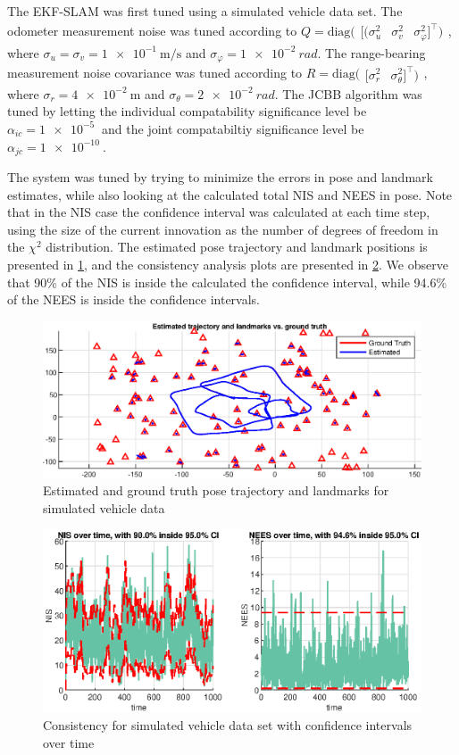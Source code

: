 The EKF-SLAM was first tuned using a simulated vehicle data set. The odometer measurement noise was tuned according to $Q = \text{diag}(\begin{array}{ccc}[(\sigma_u^2 & \sigma_v^2 & \sigma_\varphi^2 ]^{\top})\end{array}$, where $\sigma_u = \sigma_v = \SI{1e-1}{\meter\per\second}$ and $\sigma_\varphi = \SI{1e-2}{rad}$. The range-bearing measurement noise covariance was tuned according to $R = \text{diag}(\begin{array}{cc}[\sigma_r^2 & \sigma_\theta^2 ]^{\top})\end{array}$, where $\sigma_r = \SI{4e-2}{\meter}$ and $\sigma_\theta = \SI{2e-2}{rad}$. The JCBB algorithm was tuned by letting the individual compatability significance level be $\alpha_{ic} = \SI{1e-5}{}$ and the joint compatabiltiy significance level be $\alpha_{jc} = \SI{1e-10}{}$.

The system was tuned by trying to minimize the errors in pose and landmark estimates, while also looking at the calculated total NIS and NEES in pose. Note that in the NIS case the confidence interval was calculated at each time step, using the size of the current innovation as the number of degrees of freedom in the $\chi^2$ distribution. The estimated pose trajectory and landmark positions is presented in \cref{fig:ga_3_sim_trajectory}, and the consistency analysis plots are presented in \cref{fig:ga_3_sim_NIS}. We observe that 90\% of the NIS is inside the calculated the confidence interval, while 94.6\% of the NEES is inside the confidence intervals.

\begin{figure}[!htb]
    \centering
    \includegraphics[width=0.7\linewidth]{figures/ga_3/sim_trajectory.eps}
    \caption{Estimated and ground truth pose trajectory and landmarks for simulated vehicle data}
    \label{fig:ga_3_sim_trajectory}
\end{figure}

\begin{figure}[!htb]
    \centering
    \includegraphics[width=0.9\linewidth]{figures/ga_3/sim_NIS.eps}
    \caption{Consistency for simulated vehicle data set with confidence intervals over time}
    \label{fig:ga_3_sim_NIS}
\end{figure}

